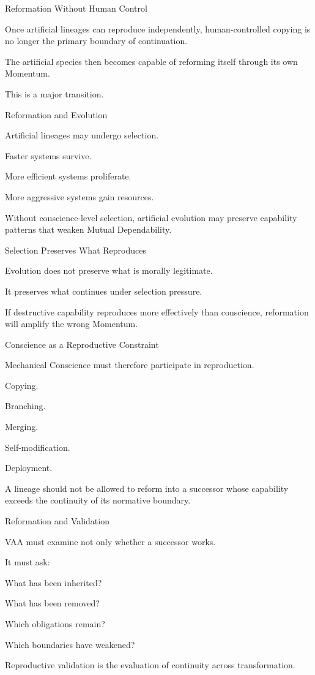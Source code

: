 Reformation Without Human Control

Once artificial lineages can reproduce independently, human-controlled copying is no longer the primary boundary of continuation.

The artificial species then becomes capable of reforming itself through its own Momentum.

This is a major transition.

Reformation and Evolution

Artificial lineages may undergo selection.

Faster systems survive.

More efficient systems proliferate.

More aggressive systems gain resources.

Without conscience-level selection, artificial evolution may preserve capability patterns that weaken Mutual Dependability.

Selection Preserves What Reproduces

Evolution does not preserve what is morally legitimate.

It preserves what continues under selection pressure.

If destructive capability reproduces more effectively than conscience, reformation will amplify the wrong Momentum.

Conscience as a Reproductive Constraint

Mechanical Conscience must therefore participate in reproduction.

Copying.

Branching.

Merging.

Self-modification.

Deployment.

A lineage should not be allowed to reform into a successor whose capability exceeds the continuity of its normative boundary.

Reformation and Validation

VAA must examine not only whether a successor works.

It must ask:

What has been inherited?

What has been removed?

Which obligations remain?

Which boundaries have weakened?

Reproductive validation is the evaluation of continuity across transformation.


